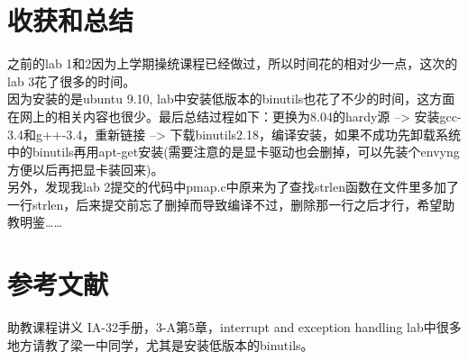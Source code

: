 \documentclass[11pt,a4paper]{article}
\begin{document}
\section{收获和总结}
之前的lab 1和2因为上学期操统课程已经做过，所以时间花的相对少一点，这次的lab 3花了很多的时间。\\
因为安装的是ubuntu 9.10, lab中安装低版本的binutils也花了不少的时间，这方面在网上的相关内容也很少。最后总结过程如下：更换为8.04的hardy源 --> 安装gcc-3.4和g++-3.4，重新链接 --> 下载binutils2.18，编译安装，如果不成功先卸载系统中的binutils再用apt-get安装(需要注意的是显卡驱动也会删掉，可以先装个envyng方便以后再把显卡装回来)。\\
另外，发现我lab 2提交的代码中pmap.c中原来为了查找strlen函数在文件里多加了一行strlen，后来提交前忘了删掉而导致编译不过，删除那一行之后才行，希望助教明鉴……\\

\section{参考文献}
\begin{thebibliography}{10}
 助教课程讲义
 IA-32手册，3-A第5章，interrupt and exception handling
 lab中很多地方请教了梁一中同学，尤其是安装低版本的binutils。
\end{thebibliography}
\end{document}
